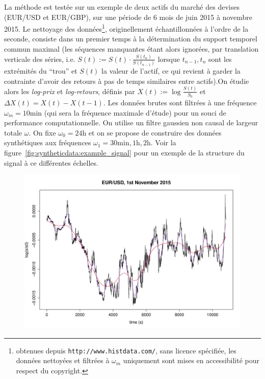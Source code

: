 {La méthode est testée sur un exemple de deux actifs du marché des devises (EUR/USD et EUR/GBP), sur une période de 6 mois de juin 2015 à novembre 2015. Le nettoyage des données\footnote{obtenues depuis \texttt{http://www.histdata.com/}, sans licence spécifiée, les données nettoyées et filtrées à $\omega_m$ uniquement sont mises en accessibilité pour respect du copyright.}, originellement échantillonnées à l'ordre de la seconde, consiste dans un premier temps à la détermination du support temporel commun maximal (les séquences manquantes étant alors ignorées, par translation verticale des séries, i.e. $S(t):=S(t)\cdot \frac{S(t_{n})}{S(t_{n-1})}$ lorsque $t_{n-1},t_n$ sont les extrémités du ``trou'' et $S(t)$ la valeur de l'actif, ce qui revient à garder la contrainte d'avoir des retours à pas de temps similaires entre actifs).On étudie alors les \emph{log-prix} et \emph{log-retours}, définis par $X(t):=\log{\frac{S(t)}{S_0}}$ et $\Delta X (t) = X(t) - X(t-1)$. Les données brutes sont filtrées à une fréquence $\omega_m = 10\textrm{min}$ (qui sera la fréquence maximale d'étude) pour un souci de performance computationnelle. On utilise un filtre gaussien non causal de largeur totale $\omega$. On fixe $\omega_0=24\textrm{h}$ et on se propose de construire des données synthétiques aux fréquences $\omega_1 = 30\textrm{min},1\textrm{h},2\textrm{h}$. Voir la figure~\ref{fig:syntheticdata:example_signal} pour un exemple de la structure du signal à ce différentes échelles.
}


\begin{figure}%
\includegraphics[width=\linewidth]{Figures/Final/C-syntheticdata-example_signal.jpg}
\end{figure}

